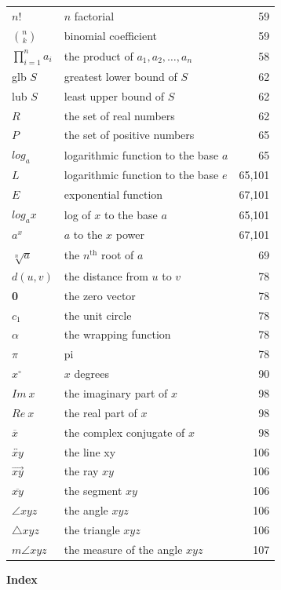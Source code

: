 \newpage
\lhead{}
\begin{tabular}{l l r}
$n!$&$n$ factorial& 59 \\
$\binom{n}{k}$& binomial coefficient& 59\\
$\prod_{i=1}^{n}a_{i}$&the product of $a_{1}, a_{2}, \dots  ,a_{n}$& 58\\
glb $S$ &greatest lower bound of $S$& 62 \\
lub $S$ &least upper bound of $S$& 62 \\
$R$ & the set of real numbers & 62\\
$P$ &the set of positive numbers& 65 \\
$log_{a}$ &logarithmic function to the base $a$& 65 \\
$L$ &logarithmic function to the base $e$ &65,101 \\
$E$& exponential function& 67,101 \\
$log_{a}x$& log of $x$ to the base $a$ &65,101\\
$a^{x}$& $a$ to the $x$ power& 67,101 \\
$\sqrt[n]{a}$  & the $n^{\text{th}}$ root of $a$ &69 \\
$d(u, v)$& the distance from $u$ to $v$& 78\\
\textbf{0}& the zero vector &78 \\
$c_{1}$& the unit circle &78 \\
$\alpha$& the wrapping function& 78 \\
$\pi$ &pi& 78 \\
$x^{\circ} $& $x$ degrees& 90\\
$Im~x$& the imaginary part of $x$ &98 \\
$Re~x$& the real part of $x$& 98 \\
$\overline{x}$ &the complex conjugate of $x$& 98 \\
$\overleftrightarrow{xy}$& the line xy& 106 \\
$\overrightarrow{xy}$ &the ray $xy$& 106 \\
$\overline{xy}$ &the segment $xy$ &106\\
$\angle xyz$& the angle $xyz$& 106\\
$\triangle xyz$& the triangle $xyz$& 106 \\
$m \angle xyz$&the measure of the angle $xyz$ &107\\
\end{tabular}
\newpage
\lhead{}
\begin{center}
\textbf{Index}
\end{center}
$ $\nl
